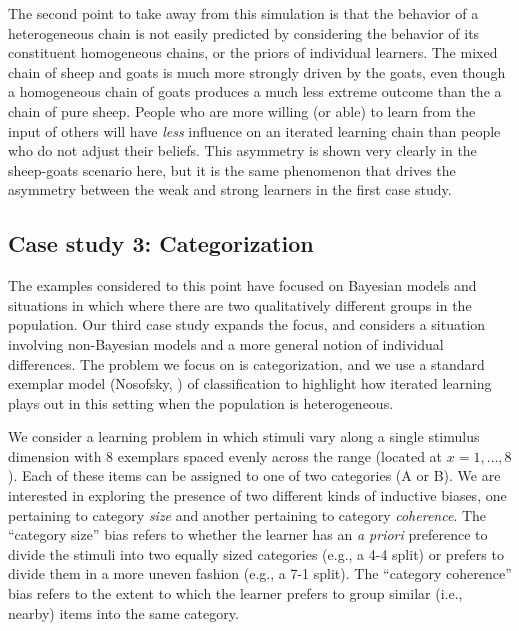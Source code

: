 \documentclass[doc]{apa6}
\begin{document}
The second point to take away from this simulation is that the behavior of a heterogeneous chain is not easily predicted by considering the behavior of its constituent homogeneous chains, or the priors of individual learners. The mixed chain of {\sc sheep} and {\sc goats} is much more strongly driven by the {\sc goats}, even though a homogeneous chain of {\sc goats} produces a much less extreme outcome than the a chain of pure {\sc sheep}. People who are more willing (or able) to learn from the input of others will have {\it less} influence on an iterated learning chain than people who do not adjust their beliefs. This asymmetry is shown very clearly in the {\sc sheep-goats} scenario here, but it is the same phenomenon that drives the asymmetry between the {\sc weak} and {\sc strong} learners in the first case study. 

\subsection{Case study 3: Categorization}

The examples considered to this point have focused on Bayesian models and situations in which where there are two qualitatively different groups in the population. Our third case study expands the focus, and considers a situation involving non-Bayesian models and a more general notion of individual differences. The problem we focus on is categorization, and we use a standard exemplar model (Nosofsky, \citeyear{nosofsky_attention_1986}) of classification to highlight how iterated learning plays out in this setting when the population is heterogeneous. 

We consider a learning problem in which stimuli vary along a single stimulus dimension with 8 exemplars spaced evenly across the range (located at $x=1,\ldots,8$). Each of these items can be assigned to one of two categories (A or B). We are interested in exploring the presence of two different kinds of inductive biases, one pertaining to category {\it size} and another pertaining to category {\it coherence}. The ``category size'' bias refers to whether the learner has an {\it a priori} preference to divide the stimuli into two equally sized categories (e.g., a 4-4 split) or prefers to divide them in a more uneven fashion (e.g., a 7-1 split). The ``category coherence'' bias refers to the extent to which the learner prefers to group similar (i.e., nearby) items into the same category. 
\end{document}
